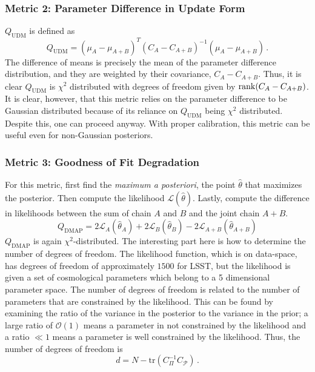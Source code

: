 \subsubsection{Metric 2: Parameter Difference in Update Form}
$Q_{\mathrm{UDM}}$ is defined as
\begin{equation}
    Q_{\mathrm{UDM}} = {(\mu_A - \mu_{A+B})}^T{(C_A-C_{A+B})}^{-1}(\mu_A - \mu_{A+B})\,.
\end{equation}
The difference of means is precisely the mean of the parameter difference distribution, and they are weighted by their covariance, $C_A-C_{A+B}$.
Thus, it is clear $Q_{\mathrm{UDM}}$ is $\chi^2$ distributed with degrees of freedom given by $\rank(C_A-C_{A+B})$. 
It is clear, however, that this metric relies on the parameter difference to be Gaussian distributed because of its reliance on $Q_{\mathrm{UDM}}$ being $\chi^2$ distributed. Despite this, one can proceed anyway. With proper calibration, this metric can be useful even for non-Gaussian posteriors.

\subsubsection{Metric 3: Goodness of Fit Degradation}
For this metric, first find the \textit{maximum a posteriori}, the point $\hat\theta$ that maximizes the posterior. Then compute the likelihood $\mathcal{L}(\hat\theta)$. Lastly, compute the difference in likelihoods between the sum of chain $A$ and $B$ and the joint chain $A+B$.
\begin{equation}
	Q_{\mathrm{DMAP}} = 2\mathcal{L}_A(\hat\theta_A) + 2\mathcal{L}_B(\hat\theta_B) - 2\mathcal{L}_{A+B}(\hat\theta_{A+B})
\end{equation}
$Q_{\mathrm{DMAP}}$ is again $\chi^2$-distributed. The interesting part here is how to determine the number of degrees of freedom. The likelihood function, which is on data-space, has degrees of freedom of approximately $1500$ for LSST, but the likelihood is given a set of cosmological parameters which belong to a 5 dimensional parameter space. The number of degrees of freedom is related to the number of parameters that are constrained by the likelihood. This can be found by examining the ratio of the variance in the posterior to the variance in the prior; a large ratio of $\mathcal{O}(1)$ means a parameter in not constrained by the likelihood and a ratio $\ll 1$ means a parameter is well constrained by the likelihood. Thus, the number of degrees of freedom is
\begin{equation}
	d = N-\mathrm{tr}(C_\Pi^{-1}C_\mathcal{P})\,.
\end{equation}

